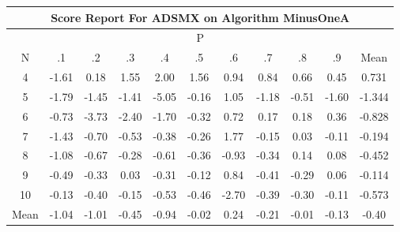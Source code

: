 \documentclass[11pt,a4paper]{report}
\begin{document}
\begin{longtable}{ | c || c | c | c | c | c | c | c | c | c || c |}
\hline
\multicolumn{11}{|c|}{ Score Report For ADSMX on Algorithm MinusOneA} \\
\hline
\multicolumn{11}{|c|}{ P } \\
\hline
N & .1 & .2 & .3 & .4 & .5 & .6 & .7 & .8 & .9 & Mean\\
 \hline
 \hline
 \endhead
  4 &  \cellcolor[HTML]{FFD7D7} -1.61 &  \cellcolor[HTML]{F7F7FF} 0.18 &  \cellcolor[HTML]{D7D7FF} 1.55 &  \cellcolor[HTML]{CFCFFF} 2.00 &  \cellcolor[HTML]{D7D7FF} 1.56 &  \cellcolor[HTML]{E7E7FF} 0.94 &  \cellcolor[HTML]{E7E7FF} 0.84 &  \cellcolor[HTML]{EFEFFF} 0.66 &  \cellcolor[HTML]{F7F7FF} 0.45 & 0.731 \\
  5 &  \cellcolor[HTML]{FFCFCF} -1.79 &  \cellcolor[HTML]{FFD7D7} -1.45 &  \cellcolor[HTML]{FFDFDF} -1.41 &  \cellcolor[HTML]{FF8080} -5.05 &  \cellcolor[HTML]{FFF7F7} -0.16 &  \cellcolor[HTML]{E7E7FF} 1.05 &  \cellcolor[HTML]{FFDFDF} -1.18 &  \cellcolor[HTML]{FFEFEF} -0.51 &  \cellcolor[HTML]{FFD7D7} -1.60 & -1.344 \\
  6 &  \cellcolor[HTML]{FFEFEF} -0.73 &  \cellcolor[HTML]{FF9F9F} -3.73 &  \cellcolor[HTML]{FFBFBF} -2.40 &  \cellcolor[HTML]{FFD7D7} -1.70 &  \cellcolor[HTML]{FFF7F7} -0.32 &  \cellcolor[HTML]{EFEFFF} 0.72 &  \cellcolor[HTML]{F7F7FF} 0.17 &  \cellcolor[HTML]{F7F7FF} 0.18 &  \cellcolor[HTML]{F7F7FF} 0.36 & -0.828 \\
  7 &  \cellcolor[HTML]{FFDFDF} -1.43 &  \cellcolor[HTML]{FFEFEF} -0.70 &  \cellcolor[HTML]{FFEFEF} -0.53 &  \cellcolor[HTML]{FFF7F7} -0.38 &  \cellcolor[HTML]{FFF7F7} -0.26 &  \cellcolor[HTML]{CFCFFF} 1.77 &  \cellcolor[HTML]{FFFFFF} -0.15 &  \cellcolor[HTML]{FFFFFF} 0.03 &  \cellcolor[HTML]{FFFFFF} -0.11 & -0.194 \\
  8 &  \cellcolor[HTML]{FFE7E7} -1.08 &  \cellcolor[HTML]{FFEFEF} -0.67 &  \cellcolor[HTML]{FFF7F7} -0.28 &  \cellcolor[HTML]{FFEFEF} -0.61 &  \cellcolor[HTML]{FFF7F7} -0.36 &  \cellcolor[HTML]{FFE7E7} -0.93 &  \cellcolor[HTML]{FFF7F7} -0.34 &  \cellcolor[HTML]{FFFFFF} 0.14 &  \cellcolor[HTML]{FFFFFF} 0.08 & -0.452 \\
  9 &  \cellcolor[HTML]{FFEFEF} -0.49 &  \cellcolor[HTML]{FFF7F7} -0.33 &  \cellcolor[HTML]{FFFFFF} 0.03 &  \cellcolor[HTML]{FFF7F7} -0.31 &  \cellcolor[HTML]{FFFFFF} -0.12 &  \cellcolor[HTML]{E7E7FF} 0.84 &  \cellcolor[HTML]{FFF7F7} -0.41 &  \cellcolor[HTML]{FFF7F7} -0.29 &  \cellcolor[HTML]{FFFFFF} 0.06 & -0.114 \\
  10 &  \cellcolor[HTML]{FFFFFF} -0.13 &  \cellcolor[HTML]{FFF7F7} -0.40 &  \cellcolor[HTML]{FFFFFF} -0.15 &  \cellcolor[HTML]{FFEFEF} -0.53 &  \cellcolor[HTML]{FFF7F7} -0.46 &  \cellcolor[HTML]{FFBFBF} -2.70 &  \cellcolor[HTML]{FFF7F7} -0.39 &  \cellcolor[HTML]{FFF7F7} -0.30 &  \cellcolor[HTML]{FFFFFF} -0.11 & -0.573 \\
 \hline
 \hline
Mean &  \cellcolor[HTML]{FFE7E7} -1.04 &  \cellcolor[HTML]{FFE7E7} -1.01 &  \cellcolor[HTML]{FFF7F7} -0.45 &  \cellcolor[HTML]{FFE7E7} -0.94 &  \cellcolor[HTML]{FFFFFF} -0.02 &  \cellcolor[HTML]{F7F7FF} 0.24 &  \cellcolor[HTML]{FFF7F7} -0.21 &  \cellcolor[HTML]{FFFFFF} -0.01 &  \cellcolor[HTML]{FFFFFF} -0.13 &  \cellcolor[HTML]{FFF7F7} -0.40
\end{longtable}
\end{document}
